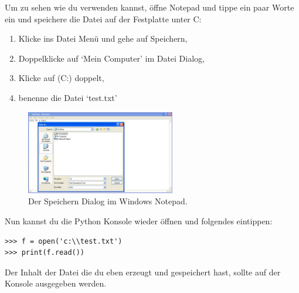 \begin{WINDOWS}
Um zu sehen wie du  verwenden kannst, öffne Notepad und tippe ein paar Worte ein und speichere die Datei auf der Festplatte unter C:

\begin{enumerate}
 \item Klicke ins Datei Menü und gehe auf Speichern,
 \item Doppelklicke auf `Mein Computer' im Datei Dialog,
 \item Klicke auf (C:) doppelt,
 \item benenne die Datei `test.txt'
\end{enumerate}

\begin{figure}
\begin{center}
\includegraphics[width=65mm]{images/figure17}
\end{center}
\caption{Der Speichern Dialog im Windows Notepad.}\label{fig17}
\end{figure}

Nun kannst du die Python Konsole wieder öffnen und folgendes eintippen:

\begin{Verbatim}[frame=single]
>>> f = open('c:\\test.txt')
>>> print(f.read())
\end{Verbatim}

Der Inhalt der Datei die du eben erzeugt und gespeichert hast, sollte auf der Konsole ausgegeben werden. %
\end{WINDOWS}

